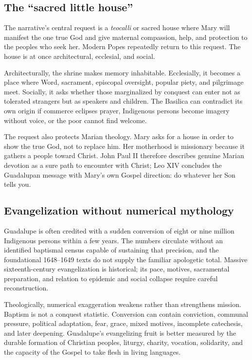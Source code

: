 \subsection{The “sacred little house”}

The narrative's central request is a \emph{teocalli} or sacred house where Mary will manifest the one true God and give maternal compassion, help, and protection to the peoples who seek her. Modern Popes repeatedly return to this request. The house is at once architectural, ecclesial, and social.

Architecturally, the shrine makes memory inhabitable. Ecclesially, it becomes a place where Word, sacrament, episcopal oversight, popular piety, and pilgrimage meet. Socially, it asks whether those marginalized by conquest can enter not as tolerated strangers but as speakers and children. The Basilica can contradict its own origin if commerce eclipses prayer, Indigenous persons become imagery without voice, or the poor cannot find welcome.

The request also protects Marian theology. Mary asks for a house in order to show the true God, not to replace him. Her motherhood is missionary because it gathers a people toward Christ. John Paul II therefore describes genuine Marian devotion as a sure path to encounter with Christ; Leo XIV concludes the Guadalupan message with Mary's own Gospel direction: do whatever her Son tells you.

\subsection{Evangelization without numerical mythology}

Guadalupe is often credited with a sudden conversion of eight or nine million Indigenous persons within a few years. The numbers circulate without an identified baptismal census capable of sustaining that precision, and the foundational 1648--1649 texts do not supply the familiar apologetic total. Massive sixteenth-century evangelization is historical; its pace, motives, sacramental preparation, and relation to epidemic and social collapse require careful reconstruction.

Theologically, numerical exaggeration weakens rather than strengthens mission. Baptism is not a conquest statistic. Conversion can contain conviction, communal pressure, political adaptation, fear, grace, mixed motives, incomplete catechesis, and later deepening. Guadalupe's evangelizing fruit is better measured by the durable formation of Christian peoples, liturgy, charity, vocation, solidarity, and the capacity of the Gospel to take flesh in living languages.

